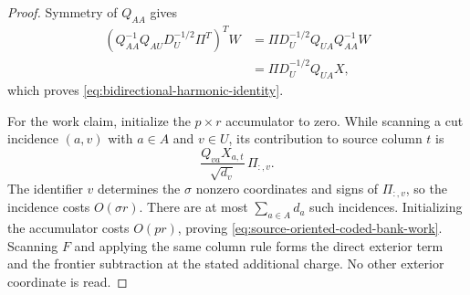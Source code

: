 \begin{proof}
Symmetry of $Q_{AA}$ gives
\begin{align*}
 \left(Q_{AA}^{-1}Q_{AU}D_U^{-1/2}\Pi^T\right)^TW
 &=\Pi D_U^{-1/2}Q_{UA}Q_{AA}^{-1}W\\
 &=\Pi D_U^{-1/2}Q_{UA}X,
\end{align*}
which proves \cref{eq:bidirectional-harmonic-identity}.

For the work claim, initialize the $p\times r$ accumulator to zero.  While
scanning a cut incidence $(a,v)$ with $a\in A$ and $v\in U$, its contribution
to source column $t$ is
\begin{equation*}
 \frac{Q_{va}X_{a,t}}{\sqrt{d_v}}\,\Pi_{:,v}.
\end{equation*}
The identifier $v$ determines the $\sigma$ nonzero coordinates and signs of
$\Pi_{:,v}$, so the incidence costs $O(\sigma r)$.  There are at most
$\sum_{a\in A}d_a$ such incidences.  Initializing the accumulator costs
$O(pr)$, proving \cref{eq:source-oriented-coded-bank-work}.  Scanning $F$
and applying the same column rule forms the direct exterior term and the
frontier subtraction at the stated additional charge.  No other exterior
coordinate is read.
\end{proof}
